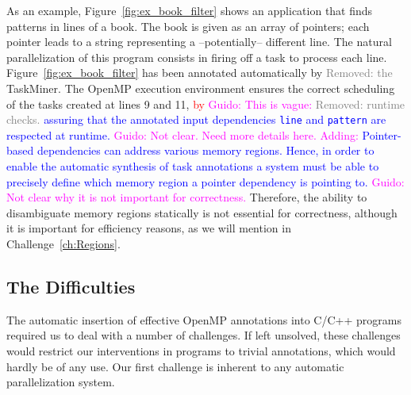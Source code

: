 \documentclass[sigplan,10pt,review,anonymous]{acmart}
\newcommand{\guido}[1]{\noindent\textcolor{magenta}{Guido: {#1}}}
\newcommand{\rmv}[1]{\noindent\textcolor{gray}{Removed: {#1}}}
\newcommand{\new}[1]{\noindent\textcolor{blue}{ {#1}}}
\newcommand{\ed}[1]{\noindent\textcolor{red}{ {#1}}}
\newcommand{\guido}[1]{}
\newcommand{\rmv}[1]{}
\newcommand{\new}[1]{#1}
\newcommand{\ed}[1]{}
\newcommand\Taskminer{\mbox{\textsf{TaskMiner}}}
\begin{document}
As an example, Figure~\ref{fig:ex_book_filter} shows an application that
finds patterns in lines of a book.
The book is given as an array of pointers; each pointer leads to a
string representing a --potentially-- different line.
The natural parallelization of this program consists in firing off a task
to process each line.
Figure~\ref{fig:ex_book_filter} has been annotated automatically by \rmv{the}
\Taskminer.
The OpenMP execution environment ensures the correct scheduling of the tasks
created at lines 9 and 11, \ed{by}  \guido{This is vague:} \rmv{runtime checks.} 
\new{assuring that the annotated input dependencies {\tt line} and {\tt pattern}  are 
respected at runtime.}
\guido{Not clear. Need more details here. Adding:} \new{Pointer-based dependencies
can address various memory regions. Hence, in order to enable the automatic
synthesis of task annotations a system must be able to precisely define which 
memory region a pointer dependency is pointing to.}
\guido{Not clear why it is not important for correctness.}
Therefore, the ability to disambiguate memory regions statically is not
essential for correctness, although it is important for efficiency reasons,
as we will mention in Challenge~\ref{ch:Regions}.

\subsection{The Difficulties}
\label{sub:dif}

The automatic insertion of effective OpenMP annotations into C/C++ programs
required us to deal with a number of challenges.
If left unsolved, these challenges would restrict our interventions in programs
to trivial annotations, which would hardly be of any use.
Our first challenge is inherent to any automatic parallelization system.
\end{document}
